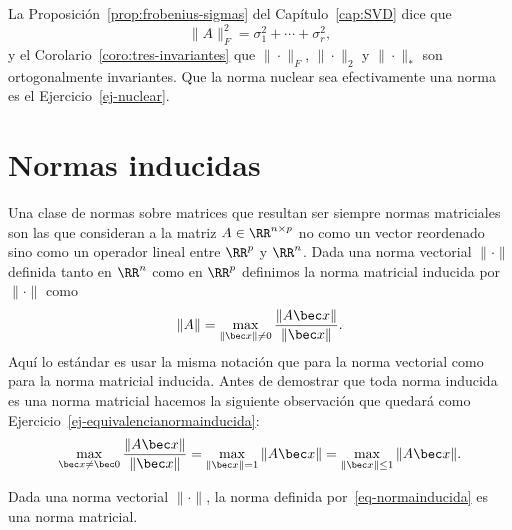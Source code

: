\begin{remark}\label{obs:frobenius-sigmas-rec}
La Proposición~\ref{prop:frobenius-sigmas} del Capítulo~\ref{cap:SVD} dice que
\[
\|A\|_F^2=\sigma_1^2+\cdots+\sigma_r^2 ,
\]
y el Corolario~\ref{coro:tres-invariantes} que $\|\cdot\|_F$, $\|\cdot\|_2$ y
$\|\cdot\|_*$ son ortogonalmente invariantes. Que la norma nuclear sea
efectivamente una norma es el Ejercicio~\ref{ej-nuclear}.
\end{remark}

\section{Normas inducidas}
\label{sec:normas-inducidas}
Una clase de normas sobre matrices que resultan ser siempre normas matriciales son las que consideran a la matriz $A \in \RR^{n\times p}$ no como un vector reordenado sino como un operador lineal entre $\RR^p$ y $\RR^n$. Dada una norma vectorial $\| \cdot \|$ definida tanto en $\RR^n$ como en $\RR^p$ definimos la norma matricial inducida por $\|\cdot\|$ como
\begin{equation}\label{eq-normainducida}
    \|A\| = \max_{\|\bec x\|\neq 0} \frac{\|A\bec x\|}{\|\bec x\|}.
\end{equation}
Aquí lo estándar es usar la misma notación que para la norma vectorial como para la norma matricial inducida. Antes de demostrar que toda norma inducida es una norma matricial hacemos la siguiente observación que quedará como Ejercicio~\ref{ej-equivalencianormainducida}:
\[\max_{\bec x \neq \bec 0}\frac{\|A\bec x\|}{\|\bec x\|} = \max_{\|\bec x \| = 1}{\|A\bec x\|} = \max_{\|\bec x \| \leq  1}{\|A\bec x\|}.   \]

\begin{thm}\label{T:consistencia}
    Dada una norma vectorial $\| \cdot \|$, la norma definida por~\eqref{eq-normainducida} es una norma matricial.
\end{thm}

